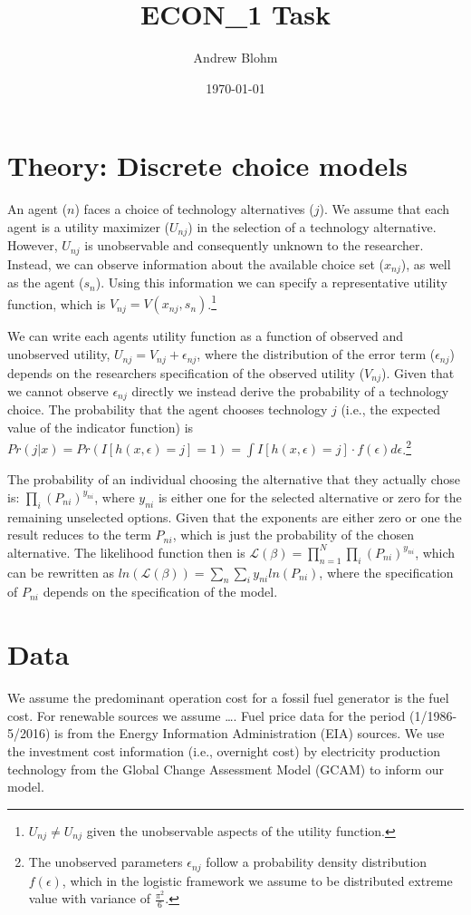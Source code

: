 \documentclass[10pt]{amsart}
\title{ECON\_1 Task}
\author{Andrew Blohm}
\date{\today}
\begin{document}
\maketitle

\section{Theory: Discrete choice models}
An agent ($n$) faces a choice of technology alternatives ($j$).  
We assume that each agent is a utility maximizer ($U_{nj}$) in the selection of a technology alternative.
However, $U_{nj}$ is unobservable and consequently unknown to the researcher.
Instead, we can observe information about the available choice set ($x_{nj}$), as well as the agent ($s_{n}$).
Using this information we can specify a representative utility function, which is $V_{nj} = V(x_{nj}, s_{n})$.\footnote{$U_{nj} \neq U_{nj}$ given the unobservable aspects of the utility function.} 

We can write each agents utility function as a function of observed and unobserved utility, $U_{nj} = V_{nj} + \epsilon_{nj}$, where the distribution of the error term ($\epsilon_{nj}$) depends on the researchers specification of the observed utility ($V_{nj}$). 
Given that we cannot observe $\epsilon_{nj}$ directly we instead derive the probability of a technology choice. 
The probability that the agent chooses technology $j$ (i.e., the expected value of the indicator function) is $Pr(j \vert x) = Pr(I[h(x, \epsilon) = j] = 1) = \int I[h(x, \epsilon) = j]\cdot f(\epsilon) d\epsilon$.\footnote{The unobserved parameters $\epsilon_{nj}$ follow a probability density distribution $f(\epsilon)$, which in the logistic framework we assume to be distributed extreme value with variance of $\frac{\pi^2}{6}$.}

The probability of an individual choosing the alternative that they actually chose is: $\prod_{i} \left(P_{ni}\right)^{y_{ni}}$, where $y_{ni}$ is either one for the selected alternative or zero for the remaining unselected options.
Given that the exponents are either zero or one the result reduces to the term $P_{ni}$, which is just the probability of the chosen alternative. 
The likelihood function then is $\mathcal{L(\beta)} = \prod_{n=1}^N \prod_{i} \left(P_{ni}\right)^{y_{ni}}$, which can be rewritten as $ln(\mathcal{L(\beta)})= \sum_{n} \sum_{i} y_{ni} ln\left(P_{ni}\right)$, where the specification of $P_{ni}$ depends on the specification of the model. 


\section{Data}
We assume the predominant operation cost for a fossil fuel generator is the fuel cost. 
For renewable sources we assume \ldots. 
Fuel price data for the period (1/1986-5/2016) is from the Energy Information Administration (EIA) sources.
We use the investment cost information (i.e., overnight cost) by electricity production technology from the Global Change Assessment Model (GCAM) to inform our model. 
\end{document}
